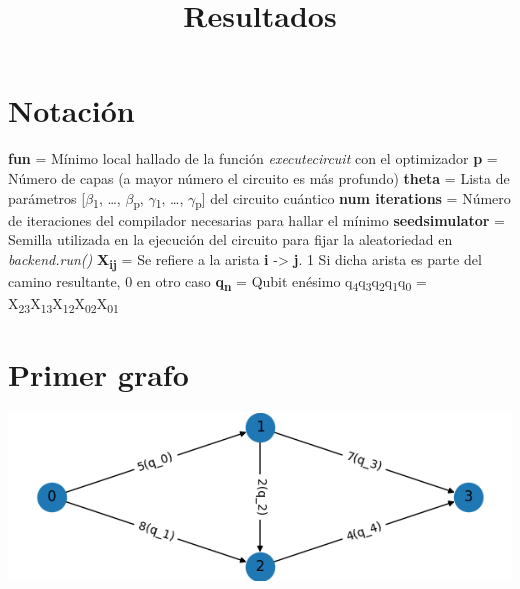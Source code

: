 \documentclass[letterpaper]{article}
\date{}
\title{Resultados}
\begin{document}
\maketitle
\tableofcontents


\section{Notación}
\label{sec:org59ce790}
\textbf{fun} = Mínimo local hallado de la función \emph{execute\textunderscore circuit} con el optimizador
\newline
\textbf{p} = Número de capas (a mayor número el circuito es más profundo)
\newline
\textbf{theta} = Lista de parámetros [\(\beta\)\textsubscript{1}, \ldots{}, \(\beta\)\textsubscript{p}, \(\gamma\)\textsubscript{1}, \ldots{}, \(\gamma\)\textsubscript{p}] del circuito cuántico
\newline
\textbf{num iterations} = Número de iteraciones del compilador necesarias para hallar el mínimo
\newline
\textbf{seed\textunderscore simulator} = Semilla utilizada en la ejecución del circuito para fijar la aleatoriedad en \emph{backend.run()}
\newline
\textbf{X\textsubscript{ij}} = Se refiere a la arista \textbf{i} -> \textbf{j}. 1 Si dicha arista es parte del camino resultante, 0 en otro caso
\newline
\textbf{q\textsubscript{n}} = Qubit enésimo
\newline
q\textsubscript{4}q\textsubscript{3}q\textsubscript{2}q\textsubscript{1}q\textsubscript{0} = X\textsubscript{23}X\textsubscript{13}X\textsubscript{12}X\textsubscript{02}X\textsubscript{01}
\newpage

\section{Primer grafo}
\label{sec:orgea5ea3f}
\begin{center}
\includegraphics[width=.9\linewidth]{./img/primer_grafo.png}
\end{center}
\newpage
\end{document}
